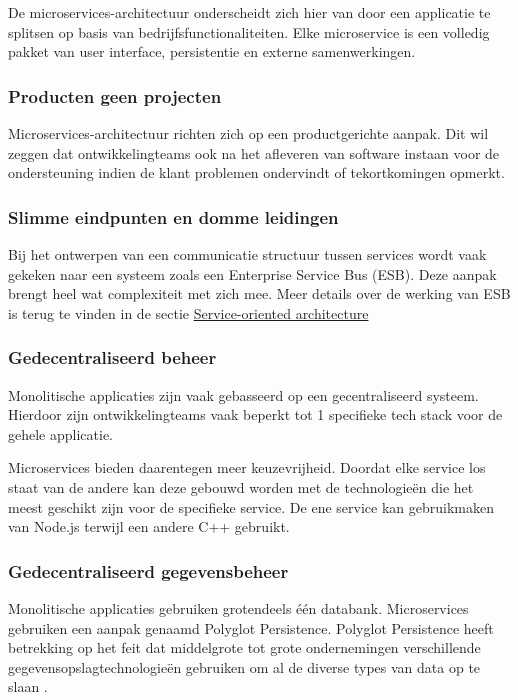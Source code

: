 De microservices-architectuur onderscheidt zich hier van door een applicatie te splitsen op basis van bedrijfsfunctionaliteiten. Elke microservice is een volledig pakket van user interface, persistentie en externe samenwerkingen.

\subsubsection{Producten geen projecten}

Microservices-architectuur richten zich op een productgerichte aanpak. Dit wil zeggen dat ontwikkelingteams ook na het afleveren van software instaan voor de ondersteuning indien de klant problemen ondervindt of tekortkomingen opmerkt.

\subsubsection{Slimme eindpunten en domme leidingen}

Bij het ontwerpen van een communicatie structuur tussen services wordt vaak gekeken naar een systeem zoals een Enterprise Service Bus (ESB). Deze aanpak brengt heel wat complexiteit met zich mee. Meer details over de werking van ESB is terug te vinden in de sectie \hyperref[sec:soa]{Service-oriented architecture}

\subsubsection{Gedecentraliseerd beheer}

Monolitische applicaties zijn vaak gebasseerd op een gecentraliseerd systeem. Hierdoor zijn ontwikkelingteams vaak beperkt tot 1 specifieke tech stack voor de gehele applicatie.

Microservices bieden daarentegen meer keuzevrijheid. Doordat elke service los staat van de andere kan deze gebouwd worden met de technologieën die het meest geschikt zijn voor de specifieke service. De ene service kan gebruikmaken van Node.js terwijl een andere C++ gebruikt.

\subsubsection{Gedecentraliseerd gegevensbeheer}

Monolitische applicaties gebruiken grotendeels één databank. Microservices gebruiken een aanpak genaamd Polyglot Persistence. Polyglot Persistence heeft betrekking op het feit dat middelgrote tot grote ondernemingen verschillende gegevensopslagtechnologieën gebruiken om al de diverse types van data op te slaan \autocite{Fowler2011}.

